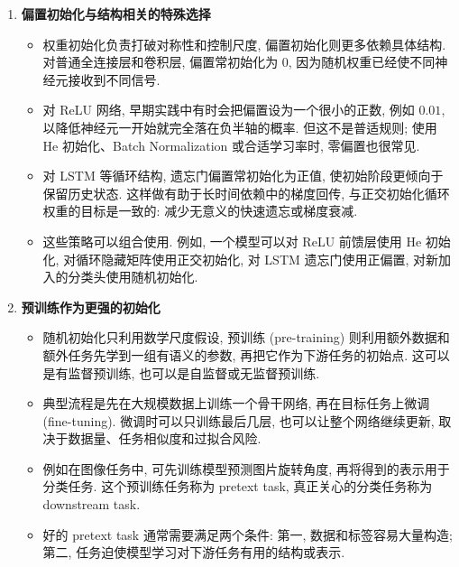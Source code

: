 \documentclass{../nndlcourse}
\begin{document}
\begin{enumerate}
\begin{itemize}
      \[
        \boldsymbol{A}
        =
        \boldsymbol{U}\boldsymbol{\Sigma}\boldsymbol{V}^{\top},
      \]
      再取 $\boldsymbol{U}$、$\boldsymbol{V}$ 或 $\boldsymbol{U}\boldsymbol{V}^{\top}$ 的适当部分作为权重矩阵. 这里的本质是对随机矩阵做正交化, 不是把初始化问题简单化为求某个对称矩阵的特征向量.
      \item 正交初始化常用于很深的网络或循环神经网络的隐藏到隐藏连接, 因为 RNN 会在时间维度上反复乘以同一类矩阵. 但在非线性激活、门控、归一化和残差连接同时存在时, 正交初始化只能缓解梯度尺度问题, 不能单独保证训练稳定.
    \end{itemize}
  \item \textbf{偏置初始化与结构相关的特殊选择}
    \begin{itemize}
      \item 权重初始化负责打破对称性和控制尺度, 偏置初始化则更多依赖具体结构. 对普通全连接层和卷积层, 偏置常初始化为 $0$, 因为随机权重已经使不同神经元接收到不同信号.
      \item 对 ReLU 网络, 早期实践中有时会把偏置设为一个很小的正数, 例如 $0.01$, 以降低神经元一开始就完全落在负半轴的概率. 但这不是普适规则; 使用 He 初始化、Batch Normalization 或合适学习率时, 零偏置也很常见.
      \item 对 LSTM 等循环结构, 遗忘门偏置常初始化为正值, 使初始阶段更倾向于保留历史状态. 这样做有助于长时间依赖中的梯度回传, 与正交初始化循环权重的目标是一致的: 减少无意义的快速遗忘或梯度衰减.
      \item 这些策略可以组合使用. 例如, 一个模型可以对 ReLU 前馈层使用 He 初始化, 对循环隐藏矩阵使用正交初始化, 对 LSTM 遗忘门使用正偏置, 对新加入的分类头使用随机初始化.
    \end{itemize}
  \item \textbf{预训练作为更强的初始化}
    \begin{itemize}
      \item 随机初始化只利用数学尺度假设, 预训练 (pre-training) 则利用额外数据和额外任务先学到一组有语义的参数, 再把它作为下游任务的初始点. 这可以是有监督预训练, 也可以是自监督或无监督预训练.
      \item 典型流程是先在大规模数据上训练一个骨干网络, 再在目标任务上微调 (fine-tuning). 微调时可以只训练最后几层, 也可以让整个网络继续更新, 取决于数据量、任务相似度和过拟合风险.
      \item 例如在图像任务中, 可先训练模型预测图片旋转角度, 再将得到的表示用于分类任务. 这个预训练任务称为 pretext task, 真正关心的分类任务称为 downstream task.
      \item 好的 pretext task 通常需要满足两个条件: 第一, 数据和标签容易大量构造; 第二, 任务迫使模型学习对下游任务有用的结构或表示.

\end{itemize}
\end{enumerate}
\end{document}
